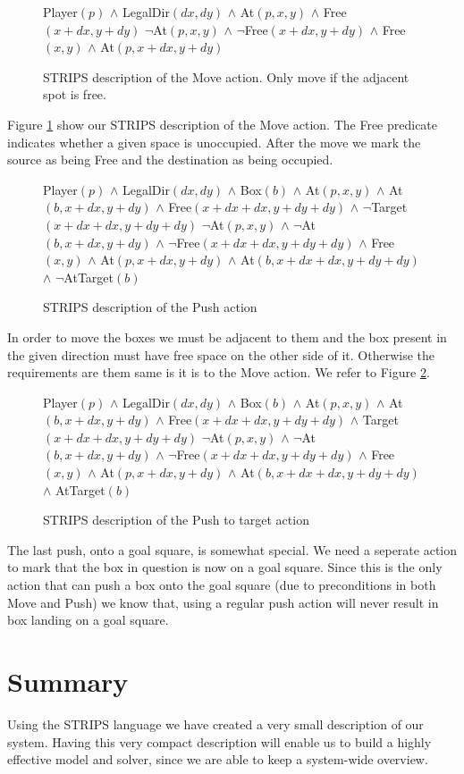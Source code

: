 \begin{figure}[!h]
  \centering {}%
  {Player$(p)$ $\wedge$ LegalDir$(dx, dy)$ $\wedge$ At$(p, x, y)$
    $\wedge$ Free$(x+dx, y+dy)$}%
  {$\neg$At$(p, x, y)$ $\wedge$ $\neg$Free$(x+dx, y+dy)$ $\wedge$
    Free$(x, y)$ $\wedge$ At$(p, x+dx, y+dy)$}
  \caption{STRIPS description of the Move action. Only move if the
    adjacent spot is free.}
  \label{fig:strips-move}
\end{figure}


Figure \ref{fig:strips-move} show our STRIPS description of the Move
action. The Free predicate indicates whether a given space is
unoccupied. After the move we mark the source as being Free and the
destination as being occupied.

\begin{figure}[!h]
  \centering {}%
  {Player$(p)$ $\wedge$ LegalDir$(dx, dy)$ $\wedge$ Box$(b)$ $\wedge$
    At$(p, x, y)$ $\wedge$ At$(b, x+dx, y+dy)$ $\wedge$ Free$(x+dx+dx,
    y+dy+dy)$ $\wedge$ $\neg$Target$(x+dx+dx, y+dy+dy)$}%
  {$\neg$At$(p, x, y)$ $\wedge$ $\neg$At$(b, x+dx, y+dy)$ $\wedge$
    $\neg$Free$(x+dx+dx, y+dy+dy)$ $\wedge$ Free$(x, y)$ $\wedge$
    At$(p, x+dx, y+dy)$ $\wedge$ At$(b, x+dx+dx, y+dy+dy)$ $\wedge$
    $\neg$AtTarget$(b)$}
  \caption{STRIPS description of the Push action}
  \label{fig:strips-push}
\end{figure}

In order to move the boxes we must be adjacent to them and the box
present in the given direction must have free space on the other side
of it. Otherwise the requirements are them same is it is to the Move
action. We refer to Figure \ref{fig:strips-push}.

\begin{figure}[!h]
  \centering {}%
  {Player$(p)$ $\wedge$ LegalDir$(dx, dy)$ $\wedge$ Box$(b)$ $\wedge$
    At$(p, x, y)$ $\wedge$ At$(b, x+dx, y+dy)$ $\wedge$ Free$(x+dx+dx,
    y+dy+dy)$ $\wedge$ Target$(x+dx+dx, y+dy+dy)$}%
  {$\neg$At$(p, x, y)$ $\wedge$ $\neg$At$(b, x+dx, y+dy)$ $\wedge$
    $\neg$Free$(x+dx+dx, y+dy+dy)$ $\wedge$ Free$(x, y)$ $\wedge$
    At$(p, x+dx, y+dy)$ $\wedge$ At$(b, x+dx+dx, y+dy+dy)$ $\wedge$
    AtTarget$(b)$}
  \caption{STRIPS description of the Push to target action}
  \label{fig:strips-pushtotarget}
\end{figure}

The last push, onto a goal square, is somewhat special. We need a
seperate action to mark that the box in question is now on a goal
square. Since this is the only action that can push a box onto the
goal square (due to preconditions in both Move and Push) we know that,
using a regular push action will never result in box landing on a goal
square.


\section{Summary}
Using the STRIPS language we have created a very small description of
our system. Having this very compact description will enable us to
build a highly effective model and solver, since we are able to keep a
system-wide overview.




